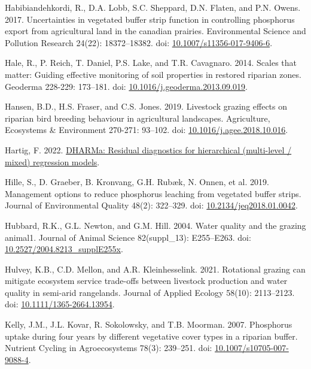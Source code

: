 \documentclass[
]{agujournal2019}
\newlength{\cslhangindent}
\newenvironment{CSLReferences}[2] %
 {\begin{list}{}{%
  \setlength{\itemindent}{0pt}
  \setlength{\leftmargin}{0pt}
  \setlength{\parsep}{0pt}
  \ifodd #1
   \setlength{\leftmargin}{\cslhangindent}
   \setlength{\itemindent}{-1\cslhangindent}
  \fi
  \setlength{\itemsep}{#2\baselineskip}}}
 {\end{list}}
\begin{document}
\begin{CSLReferences}{1}{1}
Habibiandehkordi, R., D.A. Lobb, S.C. Sheppard, D.N. Flaten, and P.N.
Owens. 2017. Uncertainties in vegetated buffer strip function in
controlling phosphorus export from agricultural land in the canadian
prairies. Environmental Science and Pollution Research 24(22):
18372--18382. doi:
\href{https://doi.org/10.1007/s11356-017-9406-6}{10.1007/s11356-017-9406-6}.

Hale, R., P. Reich, T. Daniel, P.S. Lake, and T.R. Cavagnaro. 2014.
Scales that matter: Guiding effective monitoring of soil properties in
restored riparian zones. Geoderma 228-229: 173--181. doi:
\href{https://doi.org/10.1016/j.geoderma.2013.09.019}{10.1016/j.geoderma.2013.09.019}.

Hansen, B.D., H.S. Fraser, and C.S. Jones. 2019. Livestock grazing
effects on riparian bird breeding behaviour in agricultural landscapes.
Agriculture, Ecosystems \& Environment 270-271: 93--102. doi:
\href{https://doi.org/10.1016/j.agee.2018.10.016}{10.1016/j.agee.2018.10.016}.

Hartig, F. 2022.
\href{https://CRAN.R-project.org/package=DHARMa}{DHARMa: Residual
diagnostics for hierarchical (multi-level / mixed) regression models}.

Hille, S., D. Graeber, B. Kronvang, G.H. Rubæk, N. Onnen, et al. 2019.
Management options to reduce phosphorus leaching from vegetated buffer
strips. Journal of Environmental Quality 48(2): 322--329. doi:
\href{https://doi.org/10.2134/jeq2018.01.0042}{10.2134/jeq2018.01.0042}.

Hubbard, R.K., G.L. Newton, and G.M. Hill. 2004. Water quality and the
grazing animal1. Journal of Animal Science 82(suppl{\_}13): E255--E263.
doi:
\href{https://doi.org/10.2527/2004.8213_supplE255x}{10.2527/2004.8213\_supplE255x}.

Hulvey, K.B., C.D. Mellon, and A.R. Kleinhesselink. 2021. Rotational
grazing can mitigate ecosystem service trade-offs between livestock
production and water quality in semi-arid rangelands. Journal of Applied
Ecology 58(10): 2113--2123. doi:
\href{https://doi.org/10.1111/1365-2664.13954}{10.1111/1365-2664.13954}.

Kelly, J.M., J.L. Kovar, R. Sokolowsky, and T.B. Moorman. 2007.
Phosphorus uptake during four years by different vegetative cover types
in a riparian buffer. Nutrient Cycling in Agroecosystems 78(3):
239--251. doi:
\href{https://doi.org/10.1007/s10705-007-9088-4}{10.1007/s10705-007-9088-4}.


\end{CSLReferences}
\end{document}
